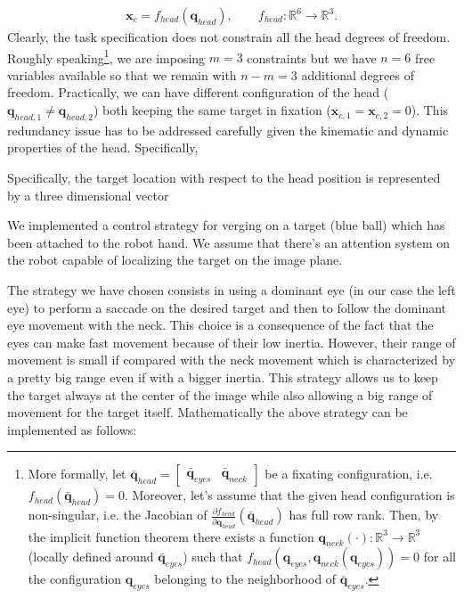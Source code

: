 \begin{eqnarray*}
\mathbf x_c = f_{head} (\mathbf q_{head}), \qquad f_{head} : \mathbb R^6 \longrightarrow \mathbb R^3.
\end{eqnarray*}
Clearly, the task specification does not constrain all the head degrees of freedom. Roughly speaking\footnote{More formally, let $\bar {\mathbf q}_{head} = \begin{bmatrix} \bar {\mathbf q}_{eyes} & \bar {\mathbf q}_{neck} \end{bmatrix}$ be a fixating configuration, i.e. $f_{head}(\bar {\mathbf q}_{head}) = 0$. Moreover, let's assume that the given head configuration is non-singular, i.e. the Jacobian of $\frac{\partial f_{head}}{\partial \mathbf q_{head}}(\bar {\mathbf q}_{head})$ has full row rank. Then, by the implicit function theorem there exists a function $\mathbf q_{neck}(\cdot): \mathbb R^3 \longrightarrow \mathbb R^3$ (locally defined around $\bar {\mathbf q}_{eyes}$) such that $f_{head}({\mathbf q}_{eyes}, {\mathbf q}_{neck} ({\mathbf q}_{eyes}) ) = 0$ for all the configuration ${\mathbf q}_{eyes}$ belonging to the neighborhood of $\bar {\mathbf q}_{eyes}$.}, we are imposing $m=3$ constraints but we have $n=6$ free variables available so that we remain with $n-m=3$ additional degrees of freedom. Practically, we can have different configuration of the head ($\mathbf q_{head,1} \neq \mathbf q_{head,2}$) both keeping the same target in fixation (${\mathbf x}_{c,1} = {\mathbf x}_{c,2} = 0$). This redundancy issue has to be addressed carefully given the kinematic and dynamic properties of the head. Specifically, 



Specifically, the target location with respect to the head position is represented by a three dimensional vector 

We implemented a control strategy for verging on a target (blue ball) which has been attached to the robot hand. We assume that there's an attention system on the robot capable of localizing the target on the image plane. 

The strategy we have chosen consists in using a dominant eye (in our case the left eye) to perform a saccade on the desired target and then to follow the dominant eye movement with the neck. This choice is a consequence of the fact that the eyes can make fast movement because of their low inertia. However, their range of movement is small if compared with the neck movement which is characterized by a pretty big range even if with a bigger inertia. This strategy allows us to keep the target always at the center of the image while also allowing a big range of movement for the target itself. Mathematically the above strategy can be implemented as follows:

